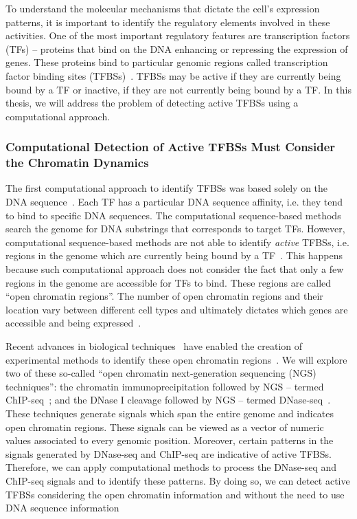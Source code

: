 To understand the molecular mechanisms that dictate the cell's expression patterns, it is important to identify the regulatory elements involved in these activities. One of the most important regulatory features are transcription factors (TFs) -- proteins that bind on the DNA enhancing or repressing the expression of genes. These proteins bind to particular genomic regions called transcription factor binding sites (TFBSs)~\citep{maston2006}. TFBSs may be active if they are currently being bound by a TF or inactive, if they are not currently being bound by a TF. In this thesis, we will address the problem of detecting active TFBSs using a computational approach.

\subsubsection{Computational Detection of Active TFBSs Must Consider the Chromatin Dynamics}

The first computational approach to identify TFBSs was based solely on the DNA sequence~\citep{stormo2000}. Each TF has a particular DNA sequence affinity, i.e. they tend to bind to specific DNA sequences. The computational sequence-based methods search the genome for DNA substrings that corresponds to target TFs. However, computational sequence-based methods are not able to identify \emph{active} TFBSs, i.e. regions in the genome which are currently being bound by a TF~\citep{pique2011}. This happens because such computational approach does not consider the fact that only a few regions in the genome are accessible for TFs to bind. These regions are called ``open chromatin regions''. The number of open chromatin regions and their location vary between different cell types and ultimately dictates which genes are accessible and being expressed~\citep{encode2012}.

Recent advances in biological techniques~\citep{shendure2008} have enabled the creation of experimental methods to identify these open chromatin regions~\citep{encode2012}. We will explore two of these so-called ``open chromatin next-generation sequencing (NGS) techniques'': the chromatin immunoprecipitation followed by NGS -- termed ChIP-seq~\citep{johnson2007}; and the DNase I cleavage followed by NGS -- termed DNase-seq~\citep{crawford2004,sabo2004a}. These techniques generate signals which span the entire genome and indicates open chromatin regions. These signals can be viewed as a vector of numeric values associated to every genomic position. Moreover, certain patterns in the signals generated by DNase-seq and ChIP-seq are indicative of active TFBSs. Therefore, we can apply computational methods to process the DNase-seq and ChIP-seq signals and to identify these patterns. By doing so, we can detect active TFBSs considering the open chromatin information and without the need to use DNA sequence information

